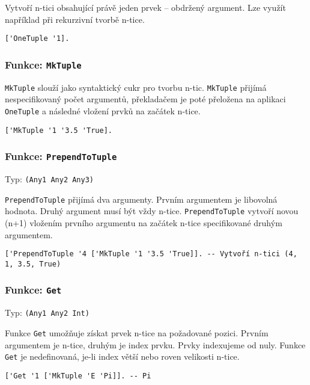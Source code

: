 Vytvoří n-tici obsahující právě jeden prvek -- obdržený argument. Lze využít například při rekurzivní
tvorbě n-tice.

\begin{lstlisting}[caption={Ukázka využití OneTuple}]
['OneTuple '1].
\end{lstlisting}

\subsubsection*{Funkce: \lstinline{MkTuple}}

\lstinline{MkTuple} slouží jako syntaktický cukr pro tvorbu n-tic. \lstinline{MkTuple} přijímá
nespecifikovaný počet argumentů, překladačem je poté přeložena na aplikaci \lstinline{OneTuple}
a následné vložení prvků na začátek n-tice.

\begin{lstlisting}[caption={Ukázka využití OneTuple}]
['MkTuple '1 '3.5 'True].
\end{lstlisting}

\subsubsection*{Funkce: \lstinline{PrependToTuple}}
Typ: \lstinline{(Any1 Any2 Any3)}

\lstinline{PrependToTuple} přijímá dva argumenty. Prvním argumentem je libovolná hodnota. Druhý
argument musí být vždy n-tice. \lstinline{PrependToTuple} vytvoří novou (n+1) vložením prvního
argumentu na začátek n-tice specifikované druhým argumentem.

\begin{lstlisting}[caption={Ukázka využití PrependToTuple}]
['PrependToTuple '4 ['MkTuple '1 '3.5 'True]]. -- Vytvoří n-tici (4, 1, 3.5, True)
\end{lstlisting}

\subsubsection*{Funkce: \lstinline{Get}}
Typ: \lstinline{(Any1 Any2 Int)}

Funkce \lstinline{Get} umožňuje získat prvek n-tice na požadované pozici. Prvním argumentem je
n-tice, druhým je index prvku. Prvky indexujeme od nuly. Funkce \lstinline{Get} je nedefinovaná,
je-li index větší nebo roven velikosti n-tice.

\begin{lstlisting}[caption={Ukázka využití Get}]
['Get '1 ['MkTuple 'E 'Pi]]. -- Pi
\end{lstlisting}

